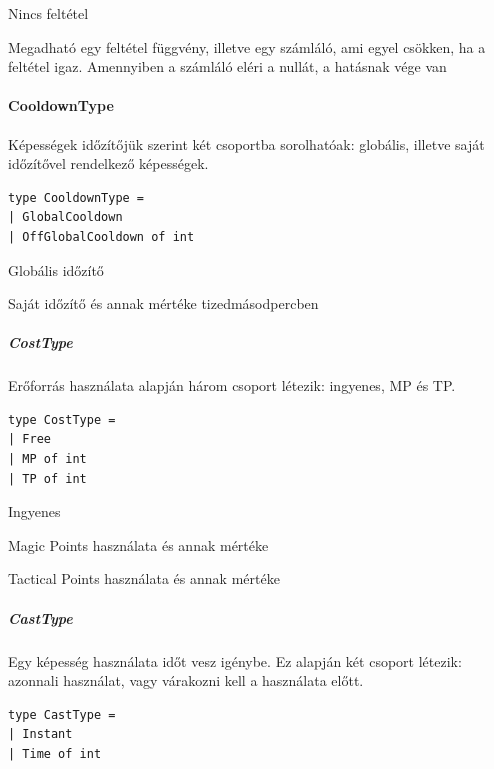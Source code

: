 \documentclass[12pt]{article}
\begin{document}
\begin{description}[align=left,labelwidth=2.5cm]
	\item [NotLimited] Nincs feltétel
	\item [LimitedUses] Megadható egy feltétel függvény, illetve egy számláló, ami egyel csökken, ha a feltétel igaz. Amennyiben a számláló eléri a nullát, a hatásnak vége van
\end{description}

\paragraph{CooldownType}

Képességek időzítőjük szerint két csoportba sorolhatóak: globális, illetve saját időzítővel rendelkező képességek.

\begin{lstlisting}
type CooldownType =
| GlobalCooldown
| OffGlobalCooldown of int
\end{lstlisting}

\begin{description}[align=left,labelwidth=3.5cm]
	\item [GlobalCooldown] Globális időzítő
	\item [OffGlobalCooldown] Saját időzítő és annak mértéke tizedmásodpercben
\end{description}

\subparagraph{CostType}

Erőforrás használata alapján három csoport létezik: ingyenes, MP és TP.

\begin{lstlisting}
type CostType =
| Free
| MP of int
| TP of int
\end{lstlisting}

\begin{description}[align=left,labelwidth=2.5cm]
	\item [Free] Ingyenes
	\item [MP] Magic Points használata és annak mértéke
	\item [TP] Tactical Points használata és annak mértéke
\end{description}

\subparagraph{CastType}

Egy képesség használata időt vesz igénybe. Ez alapján két csoport létezik: azonnali használat, vagy várakozni kell a használata előtt.

\begin{lstlisting}
type CastType =
| Instant
| Time of int
\end{lstlisting}
\end{document}
